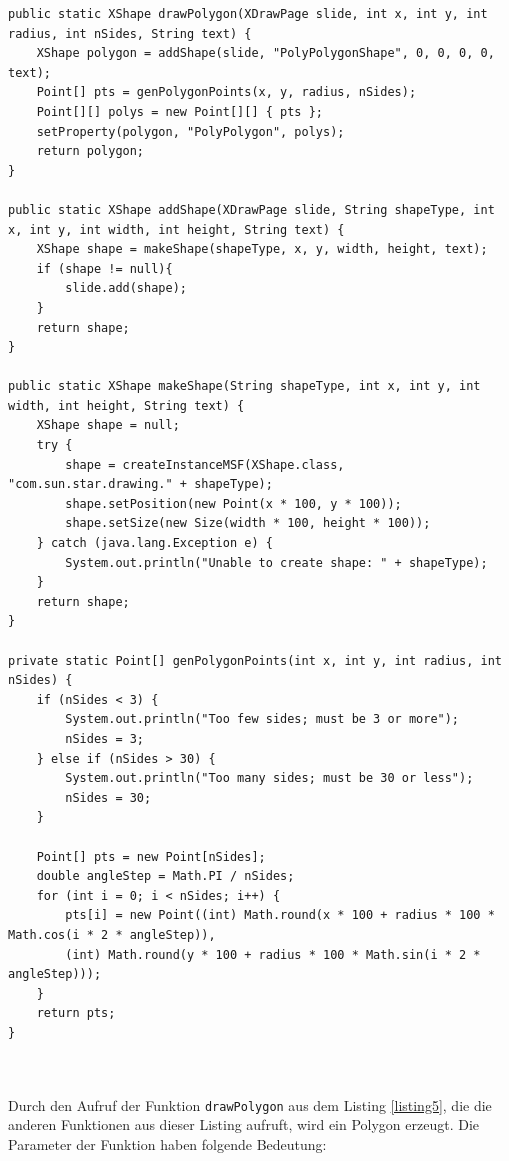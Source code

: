 \lstset{language=Java}
\lstset{frame=lines}
\hon{}
\lstset{basicstyle=\footnotesize}
\begin{lstlisting}
public static XShape drawPolygon(XDrawPage slide, int x, int y, int radius, int nSides, String text) {
    XShape polygon = addShape(slide, "PolyPolygonShape", 0, 0, 0, 0, text);
    Point[] pts = genPolygonPoints(x, y, radius, nSides);
    Point[][] polys = new Point[][] { pts };
    setProperty(polygon, "PolyPolygon", polys);
    return polygon;
}

public static XShape addShape(XDrawPage slide, String shapeType, int x, int y, int width, int height, String text) {
    XShape shape = makeShape(shapeType, x, y, width, height, text);
    if (shape != null){
        slide.add(shape);
    }
    return shape;
}

public static XShape makeShape(String shapeType, int x, int y, int width, int height, String text) {
    XShape shape = null;
    try {
        shape = createInstanceMSF(XShape.class, "com.sun.star.drawing." + shapeType);
        shape.setPosition(new Point(x * 100, y * 100));
        shape.setSize(new Size(width * 100, height * 100));
    } catch (java.lang.Exception e) {
        System.out.println("Unable to create shape: " + shapeType);
    }
    return shape;
}

private static Point[] genPolygonPoints(int x, int y, int radius, int nSides) {
    if (nSides < 3) {
        System.out.println("Too few sides; must be 3 or more");
        nSides = 3;
    } else if (nSides > 30) {
        System.out.println("Too many sides; must be 30 or less");
        nSides = 30;
    }

    Point[] pts = new Point[nSides];
    double angleStep = Math.PI / nSides;
    for (int i = 0; i < nSides; i++) {
        pts[i] = new Point((int) Math.round(x * 100 + radius * 100 * Math.cos(i * 2 * angleStep)),
        (int) Math.round(y * 100 + radius * 100 * Math.sin(i * 2 * angleStep)));
    }
    return pts;
}
\end{lstlisting}
\noindent
\\
\hon{}
\\
\noindent
Durch den Aufruf der Funktion \verb|drawPolygon| aus dem Listing \ref{listing5}, die die anderen Funktionen aus dieser Listing aufruft, wird ein Polygon erzeugt. Die Parameter der Funktion haben folgende Bedeutung:
